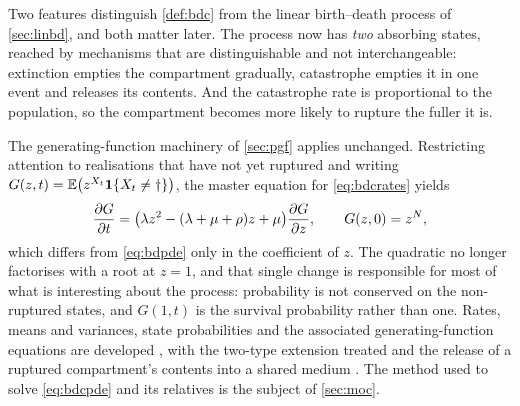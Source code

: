 Two features distinguish \cref{def:bdc} from the linear birth--death process of
\cref{sec:linbd}, and both matter later. The process now has \emph{two} absorbing
states, reached by mechanisms that are distinguishable and not interchangeable:
extinction empties the compartment gradually, catastrophe empties it in one event
and releases its contents. And the catastrophe rate is proportional to the
population, so the compartment becomes more likely to rupture the fuller it is.

The generating-function machinery of \cref{sec:pgf} applies unchanged. Restricting
attention to realisations that have not yet ruptured and writing
$G(z,t) = \mathbb{E}\!\left(z^{X_t}\mathbf 1\{X_t\neq\dagger\}\right)$, the master equation for
\cref{eq:bdcrates} yields
\begin{equation}
\label{eq:bdcpde}
\frac{\partial G}{\partial t} = \bigl(\lambda z^2-(\lambda+\mu+\rho)z+\mu\bigr)\frac{\partial G}{\partial z},
\qquad G(z,0) = z^{N},
\end{equation}
which differs from \cref{eq:bdpde} only in the coefficient of $z$. The quadratic no
longer factorises with a root at $z=1$, and that single change is responsible for
most of what is interesting about the process: probability is not conserved on the
non-ruptured states, and $G(1,t)$ is the survival probability rather than one.
Rates, means and variances, state probabilities and the associated
generating-function equations are developed , with the two-type extension treated
 and the release of a
ruptured compartment's contents into a shared medium
. The method used to solve
\cref{eq:bdcpde} and its relatives is the subject of \cref{sec:moc}.

\FloatBarrier
